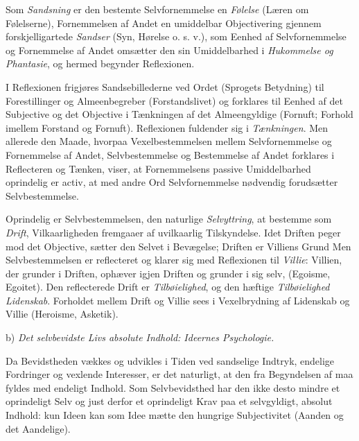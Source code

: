 \documentclass[11pt]{book}
\newcommand{\opage}[1]{\marginnote{\footnotesize\textit{[#1]}}}
\begin{document}
Som \emph{Sandsning} er den bestemte Selvfornemmelse en
\emph{Følelse} (Læren om Følelserne), Fornemmelsen af Andet en
umiddelbar Objectivering gjennem forskjelligartede \emph{Sandser}
(Syn, Hørelse o. s. v.), som Eenhed af Selvfornemmelse og Fornemmelse
af Andet omsætter den sin Umiddelbarhed i \emph{Hukommelse og
Phantasie}, og hermed begynder Reflexionen.

I Reflexionen frigjøres Sandsebillederne ved Ordet (Sprogets
Betydning) til Forestillinger og Almeenbegreber (Forstandslivet) og
forklares til Eenhed af det Subjective og
\opage{275} \setcounter{footnote}{0}%
det Objective i Tænkningen
af det Almeengyldige (Fornuft; Forhold imellem Forstand og Fornuft).
Reflexionen fuldender sig i \emph{Tænkningen}. Men allerede den
Maade, hvorpaa Vexelbestemmelsen mellem Selvfornemmelse og
Fornemmelse af Andet, Selvbestemmelse og Bestemmelse af Andet
forklares i Reflecteren og Tænken, viser, at Fornemmelsens passive
Umiddelbarhed oprindelig er activ, at med andre Ord Selvfornemmelse
nødvendig forudsætter Selvbestemmelse.

Oprindelig er Selvbestemmelsen, den naturlige \emph{Selvyttring},
at bestemme som \emph{Drift}, Vilkaarligheden fremgaaer af
uvilkaarlig Tilskyndelse. Idet Driften peger mod det Objective, sætter
den Selvet i Bevægelse; Driften er Villiens Grund Men
Selvbestemmelsen er reflecteret og klarer sig med Reflexionen til
\emph{Villie}: Villien, der grunder i Driften, ophæver igjen Driften
og grunder i sig selv, (Egoisme, Egoitet). Den reflecterede Drift er
\emph{Tilbøielighed}, og den hæftige \emph{Tilbøielighed Lidenskab}.
Forholdet mellem Drift og Villie sees i Vexelbrydning af Lidenskab og
Villie (Heroisme, Asketik).

b) \emph{Det selvbevidste Livs absolute Indhold: Ideernes
Psychologie.}

Da Bevidstheden vækkes og udvikles i Tiden ved sandselige Indtryk,
endelige Fordringer og vexlende Interesser, er det naturligt, at den
fra Begyndelsen af maa fyldes med endeligt Indhold. Som
Selvbevidsthed har den ikke desto mindre et oprindeligt Selv og just
derfor et oprindeligt Krav paa et selvgyldigt, absolut Indhold: kun
Ideen kan som Idee mætte den hungrige Subjectivitet (Aanden og det
Aandelige).
\end{document}
